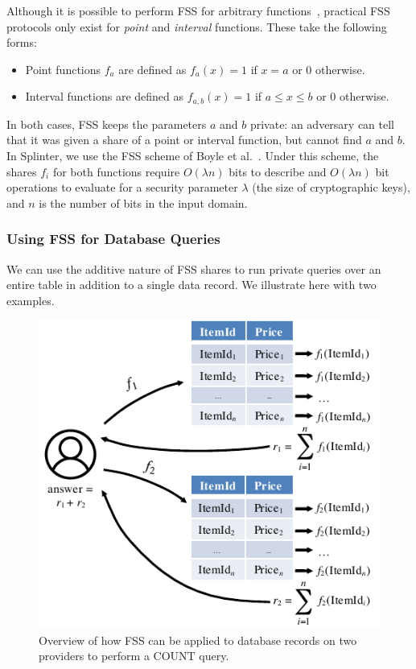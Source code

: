 Although it is possible to perform
FSS for arbitrary functions~\cite{dodis2016spooky}, 
practical FSS protocols only exist for \emph{point} and \emph{interval} functions.
These take the following forms:
\begin{itemize}
	\item Point functions $f_a$ are defined as $f_a(x)=1$ if $x=a$ or 0 otherwise.
	\item Interval functions are defined as $f_{a,b}(x)=1$ if $a \le x \le b$ or 0 otherwise.
\end{itemize}

In both cases, FSS keeps the parameters $a$ and $b$ private: an adversary can tell that
it was given a share of a point or interval function, but cannot find $a$ and $b$.
In Splinter, we use the FSS scheme of Boyle et al.~\cite{fss}.
Under this scheme, the shares $f_i$ for both functions require $O(\lambda n)$ bits to
describe and $O(\lambda n)$ bit operations to evaluate for a security parameter $\lambda$ (the size
of cryptographic keys), and $n$ is the number of bits in the input domain.

\subsubsection{Using FSS for Database Queries}
\label{sec:fss_queries}

We can use the additive nature of FSS shares to run private queries over
an entire table in addition to a single data record.
We illustrate here with two examples.

\begin{figure}
	\centering
	\includegraphics[width=\textwidth]{splinter-figs/fss.pdf}
	\caption{Overview of how FSS can be applied to database records
		on two providers to perform a COUNT query.}
	\label{fig:fss_overview}
\end{figure}


